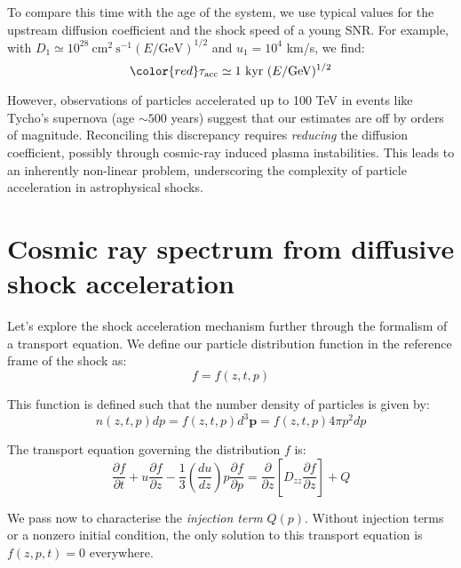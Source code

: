 To compare this time with the age of the system, we use typical values for the upstream diffusion coefficient and the shock speed of a young SNR. For example, with \( D_1 \simeq 10^{28}~\text{cm}^2~\text{s}^{-1} (E/\text{GeV})^{1/2} \) and \( u_1 = 10^4 \) km/s, we find:
%
\begin{equation}
{\color{red}\tau_{\text{acc}} \simeq 1~\text{kyr}~(E/\text{GeV})^{1/2}}
\end{equation}

However, observations of particles accelerated up to 100 TeV in events like Tycho's supernova (age \( \sim 500 \) years) suggest that our estimates are off by orders of magnitude. Reconciling this discrepancy requires \emph{reducing} the diffusion coefficient, possibly through cosmic-ray induced plasma instabilities. This leads to an inherently non-linear problem, underscoring the complexity of particle acceleration in astrophysical shocks.

\section{Cosmic ray spectrum from diffusive shock acceleration}

Let's explore the shock acceleration mechanism further through the formalism of a transport equation. We define our particle distribution function in the reference frame of the shock as:
%
\begin{equation}
f = f(z, t, p)
\end{equation}

This function is defined such that the number density of particles is given by:
%
\begin{equation}
n(z, t, p) dp = f(z, t, p) d^3 \mathbf{p} = f(z, t, p) 4 \pi p^2 dp
\end{equation}

The transport equation governing the distribution \( f \) is:
%
\begin{equation}
\frac{\partial f}{\partial t} + u\frac{\partial f}{\partial z} - \frac{1}{3}\left(\frac{du}{dz}\right)p\frac{\partial f}{\partial p} = \frac{\partial}{\partial z}\left[D_{zz} \frac{\partial f}{\partial z}\right] + Q
\end{equation}

We pass now to characterise the \emph{injection term} \( Q(p) \). Without injection terms or a nonzero initial condition, the only solution to this transport equation is \( f(z, p, t) = 0 \) everywhere.

